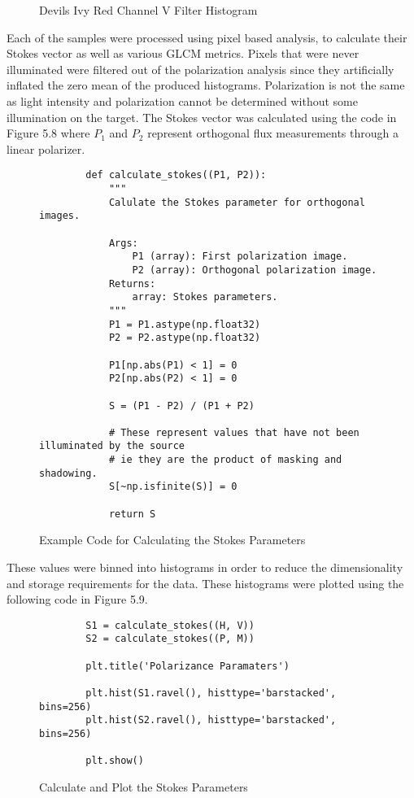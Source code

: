 \begin{figure}
    \begin{center}
    \end{center}
    \caption{Devils Ivy Red Channel V Filter Histogram}
    \label{fig:polarization}
\end{figure}
Each of the samples were processed using pixel based analysis, to calculate their Stokes vector as well as various GLCM metrics.  Pixels that were never illuminated were filtered out of the polarization analysis since they artificially inflated the zero mean of the produced histograms.  Polarization is not the same as light intensity and polarization cannot be determined without some illumination on the target.  The Stokes vector was calculated using the code in Figure 5.8 where $P_1$ and $P_2$ represent orthogonal flux measurements through a linear polarizer.
%
\begin{figure}
    \begin{lstlisting}
        def calculate_stokes((P1, P2)):
            """
            Calulate the Stokes parameter for orthogonal images.

            Args:
                P1 (array): First polarization image.
                P2 (array): Orthogonal polarization image.
            Returns:
                array: Stokes parameters.
            """
            P1 = P1.astype(np.float32)
            P2 = P2.astype(np.float32)

            P1[np.abs(P1) < 1] = 0
            P2[np.abs(P2) < 1] = 0

            S = (P1 - P2) / (P1 + P2)

            # These represent values that have not been illuminated by the source
            # ie they are the product of masking and shadowing.
            S[~np.isfinite(S)] = 0

            return S
    \end{lstlisting}
    \caption{Example Code for Calculating the Stokes Parameters}
    \label{fig:scattering}
\end{figure}
%
These values were binned into histograms in order to reduce the dimensionality and storage requirements for the data.  These histograms were plotted using the following code in Figure 5.9.
%
\begin{figure}
    \begin{lstlisting}
        S1 = calculate_stokes((H, V))
        S2 = calculate_stokes((P, M))

        plt.title('Polarizance Paramaters')

        plt.hist(S1.ravel(), histtype='barstacked', bins=256)
        plt.hist(S2.ravel(), histtype='barstacked', bins=256)

        plt.show()
    \end{lstlisting}
    \caption{Calculate and Plot the Stokes Parameters}
    \label{fig:scattering}
\end{figure}

